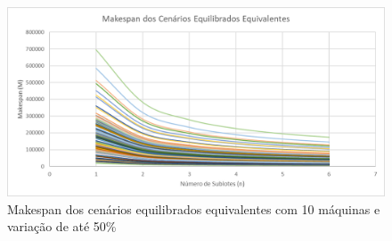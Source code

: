 \begin{figure}[!ht]
    \centering
    \includegraphics[width=12cm]{Resultados/Figuras/Meq10_50}
    \caption{Makespan dos cenários equilibrados equivalentes com 10 máquinas e variação de até 50\%}
    \label{fig:Meq10_50}
\end{figure}
